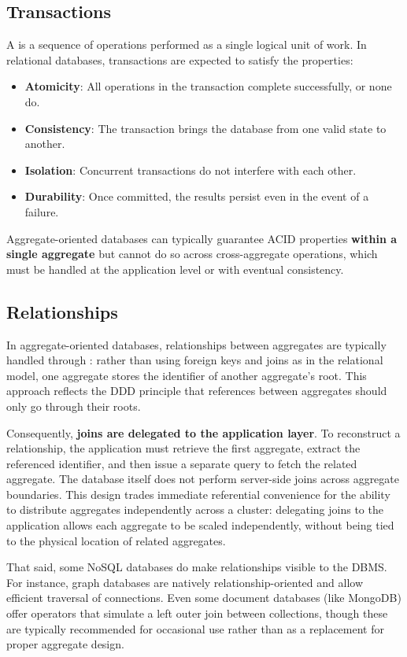 \subsection{Transactions}
A  is a sequence of operations performed as a single logical unit of work. In relational databases, transactions are expected to satisfy the  properties:
\begin{itemize}
    \item \textbf{Atomicity}: All operations in the transaction complete successfully, or none do.
    \item \textbf{Consistency}: The transaction brings the database from one valid state to another.
    \item \textbf{Isolation}: Concurrent transactions do not interfere with each other.
    \item \textbf{Durability}: Once committed, the results persist even in the event of a failure.
\end{itemize}
Aggregate-oriented databases can typically guarantee ACID properties \textbf{within a single aggregate} but cannot do so across cross-aggregate operations, which must be handled at the application level or with eventual consistency.

\subsection{Relationships}
In aggregate-oriented databases, relationships between aggregates are typically handled through : rather than using foreign keys and joins as in the relational model, one aggregate stores the identifier of another aggregate's root. 
This approach reflects the DDD principle that references between aggregates should only go through their roots.

Consequently, \textbf{joins are delegated to the application layer}. 
To reconstruct a relationship, the application must retrieve the first aggregate, extract the referenced identifier, and then issue a separate query to fetch the related aggregate. 
The database itself does not perform server-side joins across aggregate boundaries. 
This design trades immediate referential convenience for the ability to distribute aggregates independently across a cluster: delegating joins to the application allows each aggregate to be scaled independently, without being tied to the physical location of related aggregates.

That said, some NoSQL databases do make relationships visible to the DBMS. 
For instance, graph databases are natively relationship-oriented and allow efficient traversal of connections. 
Even some document databases (like MongoDB) offer  operators that simulate a left outer join between collections, though these are typically recommended for occasional use rather than as a replacement for proper aggregate design.

